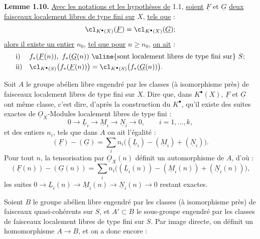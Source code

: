 
\textbf{Lemme 1.10.} \uline{Avec les notations et les hypothèses de} 1.1, \uline{soient} \(\underline{F}\) et \(\underline{G}\) \uline{deux faisceaux localement libres de type fini sur} \(X\), \uline{tels que} :
\[
  \cl_{K^{\bullet}(X)}(\underline{F})=\cl_{K^{\bullet}(X)}(\underline{G});
\]
\uline{alors il existe un entier} \(n_0\), \uline{tel que pour} \(n\geq n_0\), \uline{on ait} :
\[
\begin{array}{ll}
\text{i)}& f_*(\underline{F}(n)),\ f_*(\underline{G}(n))\text{ \uline{sont localement libres de type fini sur} }S;\\[1mm]
\text{ii)}& \cl_{K^{\bullet}(S)}\bigl(f_*(\underline{F}(n))\bigr)=\cl_{K^{\bullet}(S)}\bigl(f_*(\underline{G}(n))\bigr).
\end{array}
\]

Soit \(A\) le groupe abélien libre engendré par les classes (à isomorphisme près) de faisceaux localement libres de type fini sur \(X\). Dire que, dans \(K^{\bullet}(X)\), \(\underline{F}\) et \(\underline{G}\) ont même classe, c'est dire, d'après la construction du \(K^{\bullet}\), qu'il existe des suites exactes de \(\underline{O}_X\)-Modules localement libres de type fini :
\[
  0\longrightarrow \underline{L}_i\longrightarrow \underline{M}_i\longrightarrow \underline{N}_i\longrightarrow 0,
  \qquad i=1,\ldots,k,
\]
et des entiers \(n_i\), tels que dans \(A\) on ait l'égalité :
\[
  (\underline{F})-(\underline{G})=\sum_i n_i\bigl((\underline{L}_i)-(\underline{M}_i)+(\underline{N}_i)\bigr).
\]
Pour tout \(n\), la tensorisation par \(\underline{O}_X(n)\) définit un automorphisme de \(A\), d'où :
\[
  (\underline{F}(n))-(\underline{G}(n))=\sum_i n_i\bigl((\underline{L}_i(n))-(\underline{M}_i(n))+(\underline{N}_i(n))\bigr),
\]
les suites \(0\to \underline{L}_i(n)\to \underline{M}_i(n)\to \underline{N}_i(n)\to0\) restant exactes.

Soient \(B\) le groupe abélien libre engendré par les classes (à isomorphisme près) de faisceaux quasi-cohérents sur \(S\), et \(A'\subset B\) le sous-groupe engendré par les classes de faisceaux localement libres de type fini sur \(S\). Par image directe, on définit un homomorphisme \(A\to B\), et on a donc encore :
